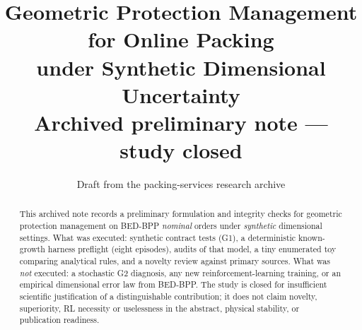 \documentclass[11pt,a4paper]{article}
\title{Geometric Protection Management for Online Packing\\
under Synthetic Dimensional Uncertainty\\
\large Archived preliminary note --- study closed}
\author{Draft from the packing-services research archive}
\date{}
\begin{document}
\maketitle

\begin{abstract}
This archived note records a preliminary formulation and integrity checks for
geometric protection management on BED-BPP \emph{nominal} orders under
\emph{synthetic} dimensional settings. What was executed: synthetic contract
tests (G1), a deterministic known-growth harness preflight (eight episodes),
audits of that model, a tiny enumerated toy comparing analytical rules, and a
novelty review against primary sources. What was \emph{not} executed: a
stochastic G2 diagnosis, any new reinforcement-learning training, or an
empirical dimensional error law from BED-BPP. The study is closed for
insufficient scientific justification of a distinguishable contribution; it
does not claim novelty, superiority, RL necessity or uselessness in the
abstract, physical stability, or publication readiness.
\end{abstract}










\end{document}
